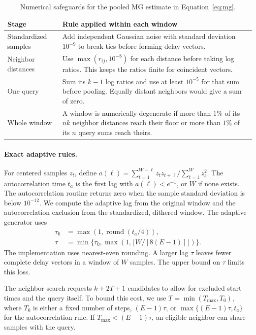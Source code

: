 {\begin{table}[htbp]
\centering\small
\caption{Numerical safeguards for the pooled MG estimate in Equation~\eqref{eq:mg}.}
\label{tab:mg-numerics}
\begin{tabularx}{\linewidth}{@{}l>{\raggedright\arraybackslash}X@{}}
\toprule
Stage & Rule applied within each window \\
\midrule
Standardized samples & Add independent Gaussian noise with standard deviation $10^{-9}$ to break ties before forming delay vectors. \\
Neighbor distances & Use $\max(r_{ij},10^{-8})$ for each distance before taking log ratios. This keeps the ratios finite for coincident vectors. \\
One query & Sum its $k-1$ log ratios and use at least $10^{-5}$ for that sum before pooling. Equally distant neighbors would give a sum of zero. \\
Whole window & A window is numerically degenerate if more than $1\%$ of its $nk$ neighbor distances reach their floor or more than $1\%$ of its $n$ query sums reach theirs. \\
\bottomrule
\end{tabularx}
\end{table}



\paragraph{Exact adaptive rules.}
For centered samples $z_t$, define $a(\ell)=\sum_{t=1}^{W-\ell}z_tz_{t+\ell}/\sum_{t=1}^Wz_t^2$. The autocorrelation time $t_a$ is the first lag with $a(\ell)<e^{-1}$, or $W$ if none exists. The autocorrelation routine returns zero when the sample standard deviation is below $10^{-12}$. We compute the adaptive lag from the original window and the autocorrelation exclusion from the standardized, dithered window. The adaptive generator uses
\[
\begin{aligned}
\tau_0&=\max(1,\operatorname{round}(t_a/4)),\\
\tau&=\min\{\tau_0,\max(1,\lfloor W/[8(E-1)]\rfloor)\}.
\end{aligned}
\]
The implementation uses nearest-even rounding. A larger lag $\tau$ leaves fewer complete delay vectors in a window of $W$ samples. The upper bound on $\tau$ limits this loss.

The neighbor search requests $k+2T+1$ candidates to allow for excluded start times and the query itself. To bound this cost, we use $T=\min(T_{\max},T_0)$, where $T_0$ is either a fixed number of steps, $(E-1)\tau$, or $\max\{(E-1)\tau,t_a\}$ for the autocorrelation rule. If $T_{\max}<(E-1)\tau$, an eligible neighbor can share samples with the query.


}
